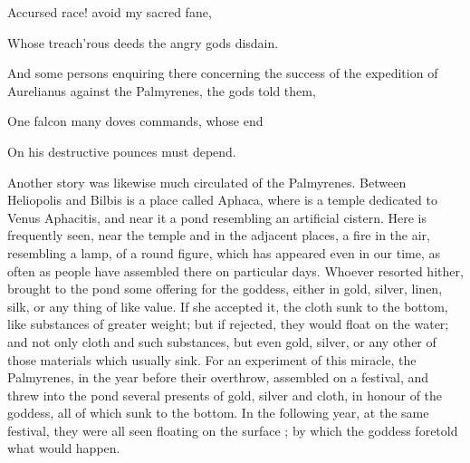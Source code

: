 Accursed race! avoid my sacred fane,

Whose treach'rous deeds the angry gods disdain.

And some persons enquiring there concerning the success of the expedition of Aurelianus against the Palmyrenes, the gods told them,

One falcon many doves commands, whose end

On his destructive pounces must depend.

Another story was likewise much circulated of the Palmyrenes. Between Heliopolis and Bilbis is a place called Aphaca, where is a temple dedicated to Venus Aphacitis, and near it a pond resembling an artificial cistern. Here is frequently seen, near the temple and in the adjacent places, a fire in the air, resembling a lamp, of a round figure, which has appeared even in our time, as often as people have assembled there on particular days. Whoever resorted hither, brought to the pond some offering for the goddess, either in gold, silver, linen, silk, or any thing of like value. If she accepted it, the cloth sunk to the bottom, like substances of greater weight; but if rejected, they would float on the water; and not only cloth and such substances, but even gold, silver, or any other of those materials which usually sink. For an experiment of this miracle, the Palmyrenes, in the year before their overthrow, assembled on a festival, and threw into the pond several presents of gold, silver and cloth, in honour of the goddess, all of which sunk to the bottom. In the following year, at the same festival, they were all seen floating on the surface ; by which the goddess foretold what would happen.

